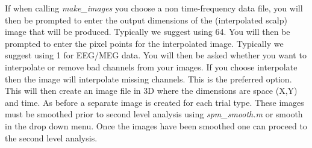 If when calling \textit{make\_images} you choose a non time-frequency data file, you will then be prompted to enter the output dimensions of the (interpolated scalp)  image that will be produced. Typically we suggest using 64.  You will then be prompted to enter the pixel points for the interpolated image. Typically we suggest using 1 for EEG/MEG data. You will then be asked whether you want to interpolate or remove bad channels from your images. If you choose interpolate then the image will interpolate missing channels. This is the preferred option.  This will then create an image file in 3D where the dimensions are space (X,Y) and time. As before a separate image is created for each trial type. These images must be smoothed prior to second level analysis using \textit{spm\_smooth.m} or smooth in the drop down menu. Once the images have been smoothed one can proceed to the second level analysis.





